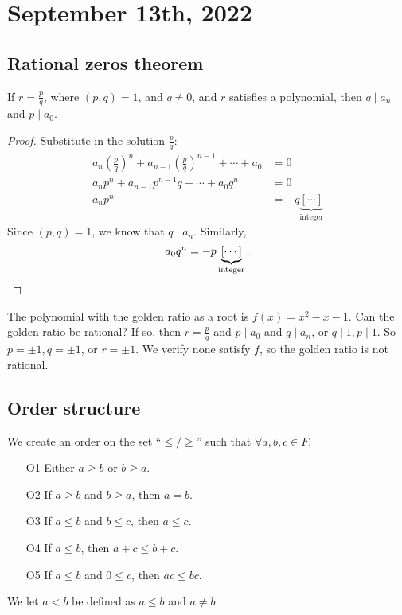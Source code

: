 \documentclass[11pt]{scrartcl}
\numberwithin{equation}{section}
\begin{document}
\section{September 13th, 2022}
\subsection{Rational zeros theorem}
\begin{theorem}
    \label{thm:ratzthm}
    If $r=\frac{p}{q}$, where $(p,q)=1$, and $q \neq 0$, and $r$ satisfies a polynomial, then $q \mid a_n$ and $p \mid a_0$.
\end{theorem}
\begin{proof}
    Substitute in the solution $\frac{p}{q}$:
    \begin{align*}
        a_n \left(\frac{p}{q}\right)^n + a_{n-1} \left(\frac{p}{q}\right)^{n-1}+\cdots+a_0 &=0 \\
        a_n p^n + a_{n-1} p^{n-1}q+\cdots+a_0q^n &=0 \\
        a_np^n &= -q\underbrace{[\cdots]}_{\text{integer}}
    \end{align*}
    Since $(p,q)=1$, we know that $q\mid a_n$.
    Similarly, 
    \[ a_0q^n = -p\underbrace{[\cdots]}_{\text{integer}}.\qedhere\]
\end{proof}
\begin{example}
    The polynomial with the golden 
    ratio as a root is $f(x) = x^2-x-1$. Can the golden ratio be rational? If so, then $r=\frac{p}{q}$ and $p\mid a_0$ and 
    $q\mid a_n$, or $q\mid1, p\mid1$. So $p=\pm1,q=\pm1$, or $r=\pm1$.
    We verify none satisfy $f$, so the golden ratio is not rational.
\end{example}
\subsection{Order structure}

\begin{axiom}
    We create an order on the set ``$\leq/\geq$'' such that $\forall a,b,c\in F$,
    \begin{itemize}
        \item[O1] Either $a\geq b$ or $b\geq a$.
        \item[O2] If $a\geq b$ and $b\geq a$, then $a=b$.
        \item[O3] If $a\leq b$ and $b\leq c$, then $a \leq c$.
        \item[O4] If $a\leq b$, then $a+c\leq b+c$.
        \item[O5] If $a\leq b$ and $0\leq c$, then $ac \leq bc$. 
    \end{itemize}
    We let $a<b$ be defined as $a\leq b$ and $a\neq b$.
\end{axiom}
\end{document}
